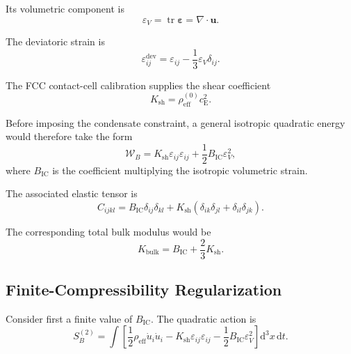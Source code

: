 Its volumetric component is
\begin{equation}
    \boxed{ \varepsilon_V = \operatorname{tr}\boldsymbol{\varepsilon} = \nabla\cdot\mathbf{u} }.
\end{equation}

The deviatoric strain is
\begin{equation}
    \varepsilon_{ij}^{\mathrm{dev}} = \varepsilon_{ij} - \frac{1}{3} \varepsilon_V\delta_{ij}.
\end{equation}

The FCC contact-cell calibration supplies the shear coefficient
\begin{equation}
    K_{\mathrm{sh}} = \rho_{\mathrm{eff}}^{(0)} c_{\mathrm{E}}^2.
\end{equation}

Before imposing the condensate constraint, a general isotropic quadratic energy would therefore take the form
\begin{equation}
    \boxed{ \mathcal{W}_B = K_{\mathrm{sh}} \varepsilon_{ij}\varepsilon_{ij} + \frac{1}{2} B_{\mathrm{IC}} \varepsilon_V^2 },
\end{equation}
where $B_{\mathrm{IC}}$ is the coefficient multiplying the isotropic volumetric strain.

The associated elastic tensor is
\begin{equation}
    C_{ijkl} = B_{\mathrm{IC}} \delta_{ij}\delta_{kl} + K_{\mathrm{sh}} \left( \delta_{ik}\delta_{jl} + \delta_{il}\delta_{jk} \right).
\end{equation}

The corresponding total bulk modulus would be
\begin{equation}
    K_{\mathrm{bulk}} = B_{\mathrm{IC}} + \frac{2}{3}K_{\mathrm{sh}}.
\end{equation}

\subsection{Finite-Compressibility Regularization}

Consider first a finite value of $B_{\mathrm{IC}}$. The quadratic action is
\begin{equation}
    \boxed{ S_B^{(2)} = \int \left[ \frac{1}{2} \rho_{\mathrm{eff}} \dot{u}_i\dot{u}_i - K_{\mathrm{sh}} \varepsilon_{ij}\varepsilon_{ij} - \frac{1}{2} B_{\mathrm{IC}} \varepsilon_V^2 \right] \mathrm{d}^3x \, \mathrm{d}t }.
\end{equation}

